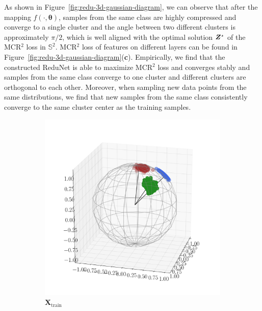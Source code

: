 \documentclass[../../book-main.tex]{subfiles}
\begin{document}
\begin{example}
As shown in Figure~\ref{fig:redu-3d-gaussian-diagram}, we can observe that after the mapping $f(\cdot, \bm{\theta})$, samples from the same class are highly compressed and converge to a single cluster and the angle between two different clusters is approximately $\pi/2$, which is well aligned with the optimal solution $\bm{Z}^{\star}$ of the MCR$^2$ loss in $\mathbb{S}^2$. 
MCR$^2$ loss of features on different layers can be found in Figure~\ref{fig:redu-3d-gaussian-diagram}(\textbf{c}). Empirically, we find that the constructed ReduNet is able to maximize MCR$^2$ loss and converges stably and samples from the same class converge to one cluster and different clusters are orthogonal to each other. 
Moreover, when sampling new data points from the same distributions, we find that new samples from the same class consistently converge to the same cluster center as the training samples. 
\begin{figure}[t]
    \begin{subfigure}[t]{0.32\textwidth}
        \centering 
        \includegraphics[width=\textwidth]{figs_chap4/scatter3d-X_train.pdf}\vspace{-0.1in}
        \caption{$\bm{X}_{\text{train}}$}
    \end{subfigure}
    \hfill
    \begin{subfigure}[t]{0.32\textwidth}
        \centering 

\end{subfigure}
\end{figure}
\end{example}
\end{document}
